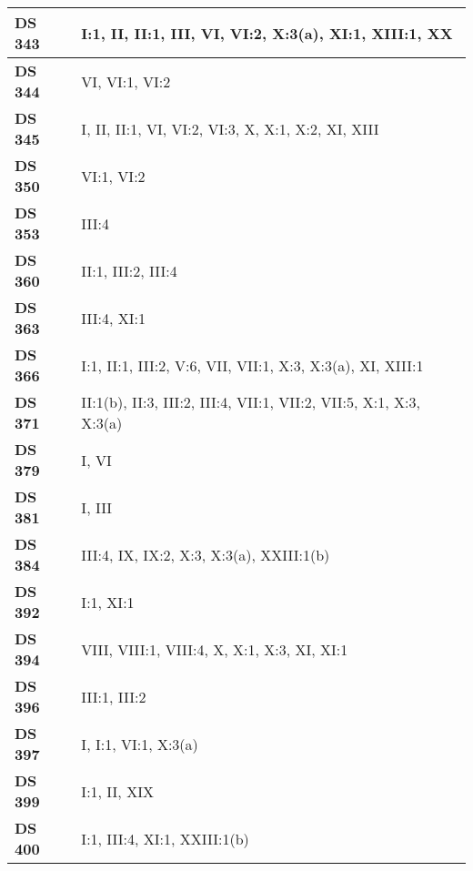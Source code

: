 \begin{xltabular}{\linewidth}{ l | X }
    \textbf {DS 343} & I:1, II, II:1, III, VI, VI:2, X:3(a), XI:1, XIII:1, XX \\ \hline 
    
    \textbf {DS 344} & VI, VI:1, VI:2 \\ \hline 
    
    \textbf {DS 345} & I, II, II:1, VI, VI:2, VI:3, X, X:1, X:2, XI, XIII \\ \hline 
    
    \textbf {DS 350} & VI:1, VI:2 \\ \hline 
    
    \textbf {DS 353} & III:4 \\ \hline 
    
    \textbf {DS 360} & II:1, III:2, III:4 \\ \hline 
    
    \textbf {DS 363} & III:4, XI:1 \\ \hline 
    
    \textbf {DS 366} & I:1, II:1, III:2, V:6, VII, VII:1, X:3, X:3(a), XI, XIII:1 \\ \hline 
    
    \textbf {DS 371} & II:1(b), II:3, III:2, III:4, VII:1, VII:2, VII:5, X:1, X:3, X:3(a) \\ \hline 
    
    \textbf {DS 379} & I, VI \\ \hline 
    
    \textbf {DS 381} & I, III \\ \hline 
    
    \textbf {DS 384} & III:4, IX, IX:2, X:3, X:3(a), XXIII:1(b) \\ \hline 
    
    \textbf {DS 392} & I:1, XI:1 \\ \hline 
    
    \textbf {DS 394} & VIII, VIII:1, VIII:4, X, X:1, X:3, XI, XI:1 \\ \hline 
    
    \textbf {DS 396} & III:1, III:2 \\ \hline 
    
    \textbf {DS 397} & I, I:1, VI:1, X:3(a) \\ \hline 
    
    \textbf {DS 399} & I:1, II, XIX \\ \hline 
    
    \textbf {DS 400} & I:1, III:4, XI:1, XXIII:1(b) \\ \hline 
    

\end{xltabular}
